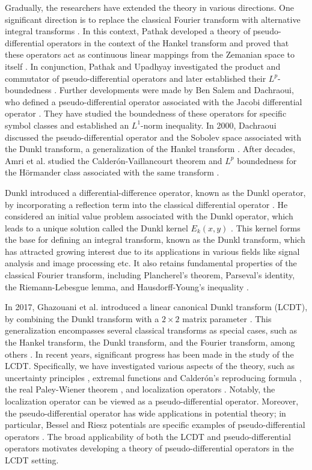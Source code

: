 \documentclass[12pt,a4paper,reqno]{amsproc}
\theoremstyle{definition}
\theoremstyle{remark}
\numberwithin{equation}{section}
\begin{document}
\par
Gradually,  the researchers have extended the theory in various directions. One significant direction is to replace the classical Fourier transform with alternative integral transforms \cite{Prasad1, Prasad}. In this context, Pathak developed a theory of pseudo-differential operators in the context of the Hankel transform and proved that these operators act as continuous linear mappings from the Zemanian space to itself \cite{Pandey}. In conjunction, Pathak and Upadhyay investigated the product and commutator of pseudo-differential operators and later established their $L^p$-boundedness \cite{ Upadhyay, Pathak}.
Further developments were made by Ben Salem and Dachraoui, who defined a pseudo-differential operator associated with the Jacobi differential operator \cite{Salem}. They have studied the boundedness of these operators for specific symbol classes and established an $L^1$-norm inequality. In 2000, Dachraoui discussed the pseudo-differential operator and the Sobolev space associated with the Dunkl transform, a generalization of the Hankel transform \cite{Dunkl1992}.  After decades,  Amri et al. studied the Calder\'on-Vaillancourt theorem and $L^p$ boundedness for the H\"ormander class associated with the same transform \cite{Abdelkefi}.
\par  Dunkl introduced a differential-difference operator, known as the Dunkl operator, by incorporating a reflection term into the classical differential operator \cite{Dunkl1992}. He considered an initial value problem associated with the Dunkl operator, which leads to a unique solution called the Dunkl kernel 
$E_k(x,y)$ \cite{soltani2004lp}. This kernel forms the base for defining an integral transform, known as the Dunkl transform, which has attracted growing interest due to its applications in various fields like signal analysis and image processing etc. It also retains fundamental properties of the classical Fourier transform, including Plancherel’s theorem, Parseval’s identity, the Riemann-Lebesgue lemma, and Hausdorff-Young's inequality \cite{soltani2004lp}.
\par In 2017, Ghazouani et al. introduced a linear canonical Dunkl transform (LCDT), by combining the Dunkl transform with a 
$2\times2$ matrix parameter \cite{ghazouani2017unified}. This generalization encompasses several classical transforms as special cases, such as the Hankel transform, the Dunkl transform, and the Fourier transform, among others \cite{Dunkl1992, Grafakos, Upadhyay}. In recent years, significant progress has been made in the study of the LCDT. Specifically, we have investigated various aspects of the theory, such as uncertainty principles \cite{USK1}, extremal functions and Calder\'on's reproducing formula \cite{USK3}, the real Paley-Wiener theorem \cite{USK2}, and localization operators \cite{USK}. Notably, the localization operator can be viewed as a pseudo-differential operator. Moreover, the pseudo-differential operator has wide applications in potential theory; in particular, Bessel and Riesz potentials are specific examples of pseudo-differential operators \cite{Grafakos}. The broad applicability of both the LCDT and pseudo-differential operators motivates developing a theory of pseudo-differential operators in the LCDT setting.
\end{document}
